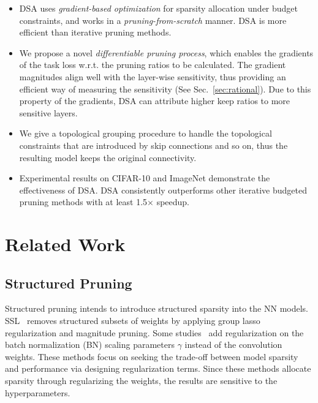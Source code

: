 \documentclass[runningheads]{llncs}
\newcommand{\dsa}{DSA\xspace}
\begin{document}
  \begin{itemize}
  \item \dsa uses \textit{gradient-based optimization} for sparsity allocation under budget constraints, and works in a \textit{pruning-from-scratch} manner. \dsa is more efficient than iterative pruning methods.
  
  \item We propose a novel \textit{differentiable pruning process}, which enables the gradients of the task loss w.r.t. the pruning ratios to be calculated. The gradient magnitudes align well with the layer-wise sensitivity,
    thus providing an efficient way of measuring the sensitivity (See Sec.~\ref{sec:rational}). Due to this property of the gradients, \dsa can attribute higher keep ratios to more sensitive layers.
  
  \item We give a topological grouping procedure to handle the topological constraints that are introduced by skip connections and so on, thus the resulting model keeps the original connectivity.
  
  \item Experimental results on CIFAR-10 and ImageNet demonstrate the effectiveness of \dsa. DSA consistently outperforms other iterative budgeted pruning methods with at least 1.5$\times$ speedup.
   
  \end{itemize}
  
  
  \section{Related Work}
  \label{sec:related}
  \subsection{Structured Pruning}
  
  Structured pruning intends to introduce structured sparsity into the NN models. 
  SSL~\cite{grouplasso} removes structured subsets of weights by applying group lasso regularization and magnitude pruning. Some studies~\cite{liu2017learning,morphnet} add regularization on the batch normalization (BN) scaling parameters $\gamma$ instead of the convolution weights. 
  These methods focus on seeking the trade-off between model sparsity and performance via designing regularization terms. Since these methods allocate sparsity through regularizing the weights, the results are sensitive to the hyperparameters.
  
\end{document}
